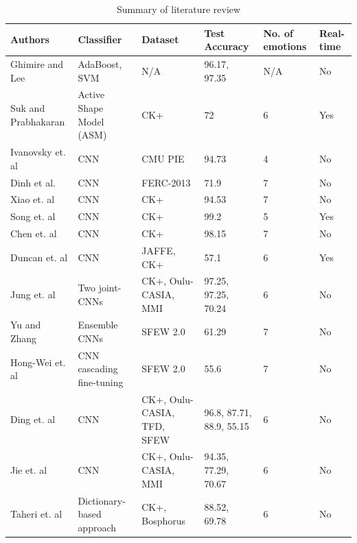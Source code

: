\documentclass[master]{thesis-uestc}
\begin{document}
\begin{center}
\begin{table}
\caption{Summary of literature review}
\begin{tabular}{ | m{5em} | m{3cm}| m{2cm} | m{2cm} | m{2cm} | m{2cm} | } 
\hline
\textbf{Authors} & \textbf{Classifier} & \textbf{Dataset} & \textbf{Test Accuracy} & \textbf{No. of emotions} & \textbf{Real-time}\\ 
\hline
Ghimire and Lee\cite{ghimire2013} & AdaBoost, SVM & N/A & 96.17, 97.35 & N/A & No\\
\hline
Suk and Prabhakaran\cite{MSu14} & Active Shape Model (ASM) & CK+ & 72 & 6 & Yes \\ 
\hline
Ivanovsky et. al\cite{Ivanovsky-2017} & CNN & CMU PIE & 94.73 & 4 & No \\
\hline
Dinh et al.\cite{sang-2017} & CNN & FERC-2013 & 71.9 & 7 & No \\
\hline
Xiao et. al\cite{8273609} & CNN & CK+ & 94.53 & 7 & No \\
\hline
Song et. al\cite{6776135} & CNN & CK+ & 99.2 & 5 & Yes \\
\hline
Chen et. al\cite{7988558} & CNN & CK+ & 98.15 & 7 & No \\
\hline
Duncan et. al\cite{duncan2016} & CNN & JAFFE, CK+ & 57.1 & 6 & Yes \\
\hline
Jung et. al\cite{7410698} & Two joint-CNNs & CK+, Oulu-CASIA, MMI & 97.25, 97.25, 70.24 & 6 & No \\
\hline
Yu and Zhang\cite{Yu:2015:IBS:2818346.2830595} & Ensemble CNNs & SFEW 2.0 & 61.29 & 7 & No \\
\hline
Hong-Wei et. al\cite{Ng:2015:DLE:2818346.2830593} & CNN cascading fine-tuning & SFEW 2.0 & 55.6 & 7 & No \\
\hline
Ding et. al\cite{7961731} & CNN & CK+, Oulu-CASIA, TFD, SFEW & 96.8, 87.71, 88.9, 55.15 & 6 & No \\
\hline
Jie et. al\cite{8373844} & CNN & CK+, Oulu-CASIA, MMI & 94.35, 77.29, 70.67 & 6 & No \\
\hline
Taheri et. al\cite{6837526} & Dictionary-based approach & CK+, Bosphorus & 88.52, 69.78 & 6 & No \\
\hline
\end{tabular}
\label{summ_literature}
\end{table}
\end{center}
\end{document}
